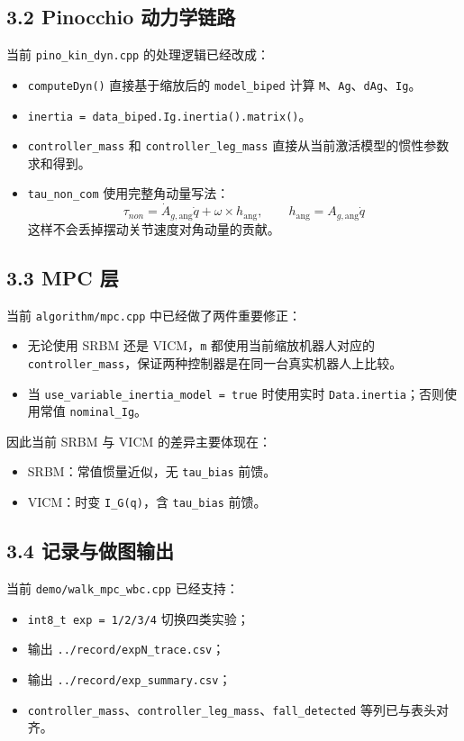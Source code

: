 \documentclass[11pt]{ctexart}
\begin{document}
\subsection*{3.2 Pinocchio 动力学链路}
当前 \texttt{pino\_kin\_dyn.cpp} 的处理逻辑已经改成：
\begin{itemize}
  \item \texttt{computeDyn()} 直接基于缩放后的 \texttt{model\_biped} 计算 \texttt{M}、\texttt{Ag}、\texttt{dAg}、\texttt{Ig}。
  \item \texttt{inertia = data\_biped.Ig.inertia().matrix()}。
  \item \texttt{controller\_mass} 和 \texttt{controller\_leg\_mass} 直接从当前激活模型的惯性参数求和得到。
  \item \texttt{tau\_non\_com} 使用完整角动量写法：
  \[
    \tau_{non} = \dot{A}_{g,\mathrm{ang}} \dot{q} + \omega \times h_{\mathrm{ang}},
    \qquad h_{\mathrm{ang}} = A_{g,\mathrm{ang}} \dot{q}
  \]
  这样不会丢掉摆动关节速度对角动量的贡献。
\end{itemize}

\subsection*{3.3 MPC 层}
当前 \texttt{algorithm/mpc.cpp} 中已经做了两件重要修正：
\begin{itemize}
  \item 无论使用 SRBM 还是 VICM，\texttt{m} 都使用当前缩放机器人对应的 \texttt{controller\_mass}，保证两种控制器是在同一台真实机器人上比较。
  \item 当 \texttt{use\_variable\_inertia\_model = true} 时使用实时 \texttt{Data.inertia}；否则使用常值 \texttt{nominal\_Ig}。
\end{itemize}
因此当前 SRBM 与 VICM 的差异主要体现在：
\begin{itemize}
  \item SRBM：常值惯量近似，无 \texttt{tau\_bias} 前馈。
  \item VICM：时变 \texttt{I\_G(q)}，含 \texttt{tau\_bias} 前馈。
\end{itemize}

\subsection*{3.4 记录与做图输出}
当前 \texttt{demo/walk\_mpc\_wbc.cpp} 已经支持：
\begin{itemize}
  \item \texttt{int8\_t exp = 1/2/3/4} 切换四类实验；
  \item 输出 \texttt{../record/expN\_trace.csv}；
  \item 输出 \texttt{../record/exp\_summary.csv}；
  \item \texttt{controller\_mass}、\texttt{controller\_leg\_mass}、\texttt{fall\_detected} 等列已与表头对齐。
\end{itemize}
\end{document}

